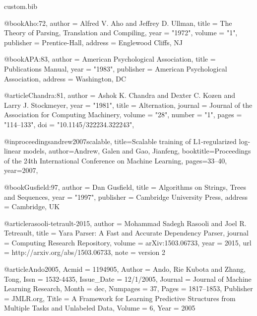 \begin{filecontents*}[overwrite]{custom.bib}

@book{Aho:72,
    author  = {Alfred V. Aho and Jeffrey D. Ullman},
    title   = {The Theory of Parsing, Translation and Compiling},
    year    = "1972",
    volume  = "1",
    publisher = {Prentice-Hall},
    address = {Englewood Cliffs, NJ}
}

@book{APA:83,
    author  = {{American Psychological Association}},
    title   = {Publications Manual},
    year    = "1983",
    publisher = {American Psychological Association},
    address = {Washington, DC}
}

@article{Chandra:81,
	author = {Ashok K. Chandra and Dexter C. Kozen and Larry J. Stockmeyer},
	year = "1981",
	title = {Alternation},
	journal = {Journal of the Association for Computing Machinery},
	volume = "28",
	number = "1",
	pages = "114--133",
	doi = "10.1145/322234.322243",
}

@inproceedings{andrew2007scalable,
  title={Scalable training of {L1}-regularized log-linear models},
  author={Andrew, Galen and Gao, Jianfeng},
  booktitle={Proceedings of the 24th International Conference on Machine Learning},
  pages={33--40},
  year={2007},
}

@book{Gusfield:97,
    author  = {Dan Gusfield},
    title   = {Algorithms on Strings, Trees and Sequences},
    year    = "1997",
    publisher = {Cambridge University Press},
    address = {Cambridge, UK}
}

@article{rasooli-tetrault-2015,
    author    = {Mohammad Sadegh Rasooli and Joel R. Tetreault},
    title     = {Yara Parser: {A} Fast and Accurate Dependency Parser},
    journal   = {Computing Research Repository},
    volume    = {arXiv:1503.06733},
    year      = {2015},
    url       = {http://arxiv.org/abs/1503.06733},
    note    = {version 2}
}

@article{Ando2005,
	Acmid = {1194905},
	Author = {Ando, Rie Kubota and Zhang, Tong},
	Issn = {1532-4435},
	Issue_Date = {12/1/2005},
	Journal = {Journal of Machine Learning Research},
	Month = dec,
	Numpages = {37},
	Pages = {1817--1853},
	Publisher = {JMLR.org},
	Title = {A Framework for Learning Predictive Structures from Multiple Tasks and Unlabeled Data},
	Volume = {6},
	Year = {2005}
}



\end{filecontents*}
